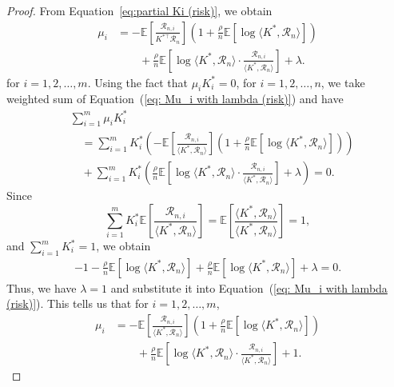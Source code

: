 \documentclass[letterpaper, 10 pt, journal, twoside]{IEEEtran}  %
\begin{document}
\begin{proof}
From Equation~\eqref{eq:partial Ki (risk)}, we obtain
    \begin{align} \label{eq: Mu_i with lambda (risk)}
        \mu_i 
        &= -\mathbb{E}\left[ \frac{\mathcal{R}_{n,i}}{K^{*\top}\mathcal{R}_n} \right] \left( 1 + \frac{\rho}{n}\mathbb{E}\left[ \log \langle K^{*}, \mathcal{R}_n \rangle \right] \right) \nonumber \\
        &\qquad +\frac{\rho}{n}\mathbb{E}\left[ \log \langle K^{*}, \mathcal{R}_n \rangle \cdot \frac{\mathcal{R}_{n,i}}{ \langle K^{*}, \mathcal{R}_n \rangle }  \right] +\lambda.
    \end{align}
for $i=1,2, \ldots, m$. Using the fact that $\mu_i K_i^* = 0$, for $i=1,2,\dots,n$, we take weighted sum of Equation~(\ref{eq: Mu_i with lambda (risk)}) and have
    \begin{align*}
        &\sum_{i=1}^m \mu_i K_i^* \\
        &\quad = \sum_{i=1}^m K_i^* \left( -\mathbb{E}\left[ \frac{\mathcal{R}_{n,i}}{ \langle K^{*}, \mathcal{R}_n \rangle } \right] \left( 1 + \frac{\rho}{n}\mathbb{E}\left[ \log \langle K^{*}, \mathcal{R}_n \rangle \right] \right) \right) \\
        &\quad + \sum_{i=1}^m K_i^* \left( \frac{\rho}{n} \mathbb{E} \left[ \log \langle K^{*}, \mathcal{R}_n\rangle \cdot \frac{ \mathcal{R}_{n,i} }{\langle K^{*}, \mathcal{R}_n \rangle}  \right] + \lambda \right) = 0. 
    \end{align*}
Since 
$$
\sum_{i=1}^m K_i^* \mathbb{E}\left[ \frac{\mathcal{R}_{n,i}}{\langle K^{*}, \mathcal{R}_n \rangle } \right] 
= \mathbb{E}\left[  \frac{\langle K^{*}, \mathcal{R}_n \rangle }{\langle K^{*}, \mathcal{R}_n \rangle} \right] = 1, 
$$
and $\sum_{i=1}^m K_i^* = 1$, we obtain
    \begin{align}
        -1 - \frac{\rho}{n} \mathbb{E}\left[ \log \langle K^{*}, \mathcal{R}_n \rangle \right] + \frac{\rho}{n} \mathbb{E}\left[ \log \langle K^{*}, \mathcal{R}_n \rangle \right] +\lambda = 0.
    \end{align}
Thus, we have $\lambda=1$ and substitute it into Equation~(\ref{eq: Mu_i with lambda (risk)}). This tells us that for $i=1,2, \ldots, m$,
    \begin{align*}
        \mu_i 
        &= -\mathbb{E}\left[ \frac{\mathcal{R}_{n,i}}{\langle K^{*}, \mathcal{R}_n \rangle } \right] \left( 1 + \frac{\rho}{n} \mathbb{E}\left[ \log \langle K^{*}, \mathcal{R}_n \rangle \right] \right) \nonumber \\
        &\qquad + \frac{\rho}{n}\mathbb{E}\left[ \log \langle K^{*}, \mathcal{R}_n \rangle  \cdot \frac{\mathcal{R}_{n,i}}{\langle K^{*}, \mathcal{R}_n \rangle }  \right] + 1.

\end{align*}
\end{proof}
\end{document}
